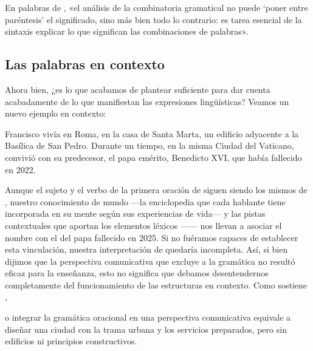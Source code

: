 \begin{destacado}
En palabras de \textcite[13]{bosque2009}, «el análisis de la combinatoria
gramatical no puede \enquote*{poner entre paréntesis} el significado, sino más
bien todo lo contrario: es tarea esencial de la sintaxis explicar lo que
significan las combinaciones de palabras».
\end{destacado}

\subsection{Las palabras en contexto}

Ahora bien, ¿es lo que acabamos de plantear suficiente para dar cuenta
acabadamente de lo que manifiestan las expresiones lingüísticas? Veamos un
nuevo ejemplo en contexto:

\begin{exe}
  \ex\label{ex:01-francisco} Francisco vivía en Roma, en la casa de Santa
      Marta, un edificio adyacente a la Basílica de San Pedro. Durante un
      tiempo, en la misma Ciudad del Vaticano, convivió con su predecesor, el
      papa emérito, Benedicto XVI, que había fallecido en 2022.
\end{exe}

Aunque el sujeto y el verbo de la primera oración de 
siguen siendo los mismos de , nuestro conocimiento de mundo
---la enciclopedia que cada hablante tiene incorporada en su mente según sus
experiencias de vida--- y las pistas contextuales que aportan los elementos
léxicos ------ nos llevan a asociar el nombre
 con el del papa fallecido en 2025. Si no fuéramos capaces de
establecer esta vinculación, nuestra interpretación de 
quedaría incompleta. Así, si bien dijimos que la perspectiva comunicativa que
excluye a la gramática no resultó eficaz para la enseñanza, esto no significa
que debamos desentendernos completamente del funcionamiento de las estructuras
en contexto. Como sostiene \textcite[s/p]{brucart2018},

\begin{cita}
[n]o integrar la gramática oracional en una perspectiva comunicativa equivale a
diseñar una ciudad con la trama urbana y los servicios preparados, pero sin
edificios ni principios constructivos.
\end{cita}

